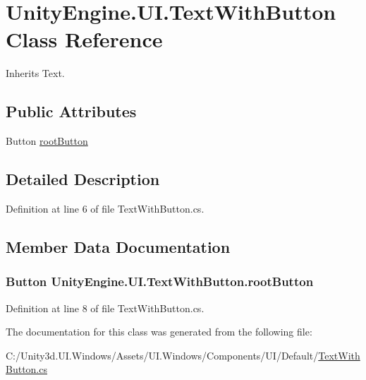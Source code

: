\hypertarget{class_unity_engine_1_1_u_i_1_1_text_with_button}{}\section{Unity\+Engine.\+U\+I.\+Text\+With\+Button Class Reference}
\label{class_unity_engine_1_1_u_i_1_1_text_with_button}


Inherits Text.

\subsection*{Public Attributes}
\begin{DoxyCompactItemize}
\item 
Button \hyperlink{class_unity_engine_1_1_u_i_1_1_text_with_button_ab160b061f81aec44b5f7817e6f747277}{root\+Button}
\end{DoxyCompactItemize}


\subsection{Detailed Description}


Definition at line 6 of file Text\+With\+Button.\+cs.



\subsection{Member Data Documentation}
\hypertarget{class_unity_engine_1_1_u_i_1_1_text_with_button_ab160b061f81aec44b5f7817e6f747277}{}
\subsubsection[{root\+Button}]{\setlength{\rightskip}{0pt plus 5cm}Button Unity\+Engine.\+U\+I.\+Text\+With\+Button.\+root\+Button}\label{class_unity_engine_1_1_u_i_1_1_text_with_button_ab160b061f81aec44b5f7817e6f747277}


Definition at line 8 of file Text\+With\+Button.\+cs.



The documentation for this class was generated from the following file\+:\begin{DoxyCompactItemize}
\item 
C\+:/\+Unity3d.\+U\+I.\+Windows/\+Assets/\+U\+I.\+Windows/\+Components/\+U\+I/\+Default/\hyperlink{_text_with_button_8cs}{Text\+With\+Button.\+cs}\end{DoxyCompactItemize}
